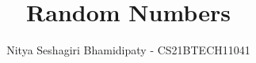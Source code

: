 \documentclass[journal,12pt,twocolumn]{IEEEtran}
\renewcommand\thesection{\arabic{section}}
\begin{document}
\let\StandardTheFigure\thefigure
\renewcommand{\thefigure}{\thesection}




\makeatletter
{}
\makeatother

\let\StandardTheFigure\thefigure
\let\StandardTheTable\thetable
\let\vec\mathbf
{}

\vspace{3cm}


\title{%
	Random Numbers
}


%
%
%

\author{Nitya Seshagiri Bhamidipaty - CS21BTECH11041}
% 
%
\end{document}
